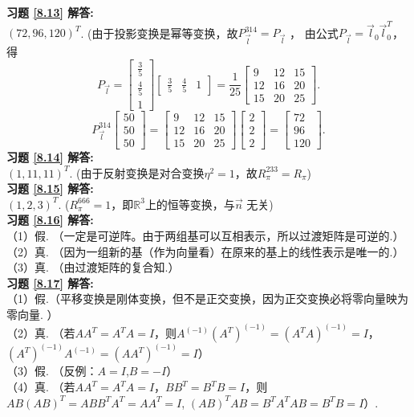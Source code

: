 \textbf{习题 \ref{8.13} 解答:}\\
$(72,96,120)^T$. (由于投影变换是幂等变换，故$P_{\vec{l}}^{314}=P_{\vec{l}}$ ，
由公式$P_{\vec{l}}=\vec{l}_0 \vec{l}_0^T$，得
\begin{equation*}
P_{\vec{l}}=\begin{bmatrix}\frac{3}{5}\\ \frac{4}{5}\\1\end{bmatrix}
\begin{bmatrix}\frac{3}{5}&\frac{4}{5}&1\end{bmatrix}=\frac{1}{25}\begin{bmatrix}9&12&15\\12&16&20\\15&20&25\end{bmatrix}.
\end{equation*}
\begin{equation*}
P_{\vec{l}}^{314}\begin{bmatrix}50\\50\\50\end{bmatrix}=
\begin{bmatrix}9&12&15\\12&16&20\\15&20&25\end{bmatrix}
\begin{bmatrix}2\\2\\2\end{bmatrix}=
\begin{bmatrix}72\\96\\120\end{bmatrix}.
\end{equation*}
\textbf{习题 \ref{8.14} 解答:}\\
$(1,11,11)^T$.  (由于反射变换是对合变换$\eta^2=1$，故$R_{\pi}^{233}=R_{\pi}$)\\
\textbf{习题 \ref{8.15} 解答:}\\
$(1,2,3)^T$.  ($R_{\pi}^{666}=1$，即$\mathbb{R}^3$上的恒等变换，与$\vec{n}$ 无关)\\
\textbf{习题 \ref{8.16} 解答:}\\
（1）假.  （一定是可逆阵。由于两组基可以互相表示，所以过渡矩阵是可逆的.）\\
（2）真. （因为一组新的基（作为向量看）在原来的基上的线性表示是唯一的.）\\
（3）真. （由过渡矩阵的复合知.）\\
\textbf{习题 \ref{8.17} 解答:}\\
（1）假.（平移变换是刚体变换，但不是正交变换，因为正交变换必将零向量映为零向量. ）\\
（2）真. （若$AA^T=A^TA=I$，则$A^(-1) (A^T )^(-1)=(A^T A)^(-1)=I$，$(A^T )^(-1) A^(-1)=(AA^T )^(-1)=I$）\\
（3）假. （反例：$A=I$,$B=-I$）\\
（4）真. （若$AA^T=A^T A=I$，$BB^T=B^T B=I$，则$AB(AB)^T=ABB^T A^T=AA^T=I$, $(AB)^T AB=B^T A^T AB=B^T B=I$）.

